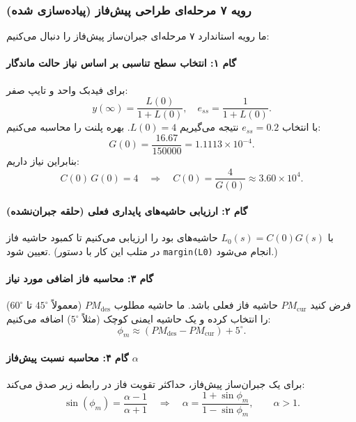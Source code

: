 \documentclass[a4paper]{article}
\begin{document}
\subsubsection{رویه ۷ مرحله‌ای طراحی پیش‌فاز (پیاده‌سازی شده)}
ما رویه استاندارد ۷ مرحله‌ای جبران‌ساز پیش‌فاز را دنبال می‌کنیم:

\paragraph{گام ۱: انتخاب سطح تناسبی بر اساس نیاز حالت ماندگار}
برای فیدبک واحد و تایپ صفر:
\[
y(\infty)=\frac{L(0)}{1+L(0)},\quad e_{ss}=\frac{1}{1+L(0)}.
\]
با انتخاب $e_{ss}=0.2$ نتیجه می‌گیریم $L(0)=4$.
بهره  پلنت را محاسبه می‌کنیم:
\begin{equation}
	G(0)=\frac{16.67}{150000}=1.1113\times10^{-4}.
\end{equation}
بنابراین نیاز داریم:
\begin{equation}
	C(0)\,G(0)=4
	\quad\Rightarrow\quad
	C(0)=\frac{4}{G(0)}\approx 3.60\times 10^4.
\end{equation}

\paragraph{گام ۲: ارزیابی حاشیه‌های پایداری فعلی (حلقه جبران‌نشده)}
با $L_0(s)=C(0)G(s)$ حاشیه‌های بود  را ارزیابی می‌کنیم تا کمبود حاشیه فاز تعیین شود. (در متلب این کار با دستور \texttt{margin(L0)} انجام می‌شود.)

\paragraph{گام ۳: محاسبه فاز اضافی مورد نیاز}
فرض کنید $PM_{\text{cur}}$ حاشیه فاز فعلی باشد. ما حاشیه مطلوب $PM_{\text{des}}$ (معمولاً $45^\circ$ تا $60^\circ$) را انتخاب کرده و یک حاشیه ایمنی کوچک (مثلاً $5^\circ$) اضافه می‌کنیم:
\begin{equation}
	\phi_m \approx \left(PM_{\text{des}}-PM_{\text{cur}}\right) + 5^\circ.
\end{equation}

\paragraph{گام ۴: محاسبه نسبت پیش‌فاز $\alpha$}
برای یک جبران‌ساز پیش‌فاز، حداکثر تقویت فاز در رابطه زیر صدق می‌کند:
\begin{equation}
	\sin(\phi_m)=\frac{\alpha-1}{\alpha+1}
	\quad\Rightarrow\quad
	\alpha=\frac{1+\sin\phi_m}{1-\sin\phi_m},\qquad \alpha>1.
\end{equation}
\end{document}

